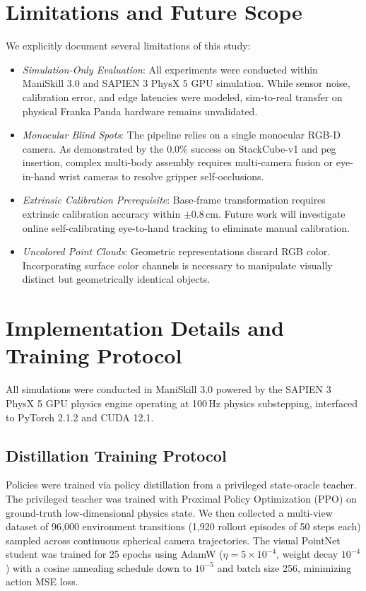 \documentclass[conference]{IEEEtran}
\begin{document}
\section{Limitations and Future Scope}
We explicitly document several limitations of this study:
\begin{itemize}
\item \textit{Simulation-Only Evaluation}: All experiments were conducted within ManiSkill 3.0 and SAPIEN 3 PhysX 5 GPU simulation. While sensor noise, calibration error, and edge latencies were modeled, sim-to-real transfer on physical Franka Panda hardware remains unvalidated.
\item \textit{Monocular Blind Spots}: The pipeline relies on a single monocular RGB-D camera. As demonstrated by the 0.0\% success on StackCube-v1 and peg insertion, complex multi-body assembly requires multi-camera fusion or eye-in-hand wrist cameras to resolve gripper self-occlusions.
\item \textit{Extrinsic Calibration Prerequisite}: Base-frame transformation requires extrinsic calibration accuracy within $\pm 0.8$\,cm. Future work will investigate online self-calibrating eye-to-hand tracking to eliminate manual calibration.
\item \textit{Uncolored Point Clouds}: Geometric representations discard RGB color. Incorporating surface color channels is necessary to manipulate visually distinct but geometrically identical objects.
\end{itemize}

\section{Implementation Details and Training Protocol}
All simulations were conducted in ManiSkill 3.0 \cite{maniskill} powered by the SAPIEN 3 PhysX 5 GPU physics engine operating at 100\,Hz physics substepping, interfaced to PyTorch 2.1.2 and CUDA 12.1.

\subsection{Distillation Training Protocol}
Policies were trained via policy distillation from a privileged state-oracle teacher. The privileged teacher was trained with Proximal Policy Optimization (PPO) on ground-truth low-dimensional physics state. We then collected a multi-view dataset of 96,000 environment transitions (1,920 rollout episodes of 50 steps each) sampled across continuous spherical camera trajectories. The visual PointNet student was trained for 25 epochs using AdamW ($\eta = 5 \times 10^{-4}$, weight decay $10^{-4}$) with a cosine annealing schedule down to $10^{-5}$ and batch size 256, minimizing action MSE loss.
\end{document}
